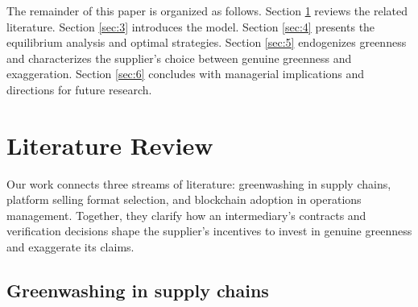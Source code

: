 \documentclass[preprint,review,12pt,authoryear,nopreprintline]{elsarticle}
\theoremstyle{definition}
\begin{document}
The remainder of this paper is organized as follows. Section \ref{sec:2} reviews the related literature. Section \ref{sec:3} introduces the model. Section \ref{sec:4} presents the equilibrium analysis and optimal strategies. Section \ref{sec:5} endogenizes greenness and characterizes the supplier's choice between genuine greenness and exaggeration. Section \ref{sec:6} concludes with managerial implications and directions for future research.

\section{Literature Review}\label{sec:2}

Our work connects three streams of literature: greenwashing in supply chains, platform selling format selection, and blockchain adoption in operations management. Together, they clarify how an intermediary's contracts and verification decisions shape the supplier's incentives to invest in genuine greenness and exaggerate its claims.

\subsection{Greenwashing in supply chains}\label{sec:2.1}
\end{document}
